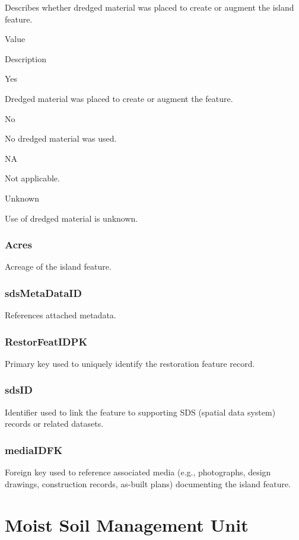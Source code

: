 \documentclass[
  letterpaper,
  DIV=11,
  numbers=noendperiod]{scrreprt}
\begin{document}
Describes whether dredged material was placed to create or augment the
island feature.

Value

Description

Yes

Dredged material was placed to create or augment the feature.

No

No dredged material was used.

NA

Not applicable.

Unknown

Use of dredged material is unknown.

\subsection{Acres}\label{acres}

Acreage of the island feature.

\subsection{sdsMetaDataID}\label{sdsmetadataid-7}

References attached metadata.

\subsection{RestorFeatIDPK}\label{restorfeatidpk-7}

Primary key used to uniquely identify the restoration feature record.

\subsection{sdsID}\label{sdsid-7}

Identifier used to link the feature to supporting SDS (spatial data
system) records or related datasets.

\subsection{mediaIDFK}\label{mediaidfk-7}

Foreign key used to reference associated media (e.g., photographs,
design drawings, construction records, as-built plans) documenting the
island feature.

\chapter{Moist Soil Management Unit}\label{moist-soil-management-unit}
\end{document}
